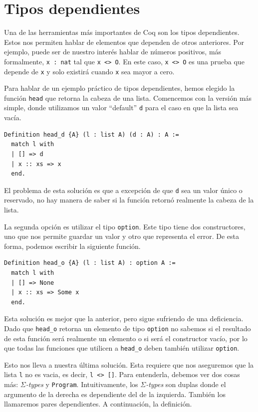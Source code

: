 \section{Tipos dependientes}

Una de las herramientas más importantes de Coq son los tipos dependientes. Estos nos permiten hablar de elementos que dependen de otros anteriores. Por ejemplo, puede ser de nuestro interés hablar de números positivos, más formalmente, \lstinline{x : nat} tal que \lstinline{x <> O}. En este caso, \lstinline{x <> O} es una prueba que depende de \lstinline{x} y solo existirá cuando \lstinline{x} sea mayor a cero.

Para hablar de un ejemplo práctico de tipos dependientes, hemos elegido la función \lstinline{head} que retorna la cabeza de una lista. Comencemos con la versión más simple, donde utilizamos un valor ``default'' \lstinline{d} para el caso en que la lista sea vacía.

\begin{lstlisting}
Definition head_d {A} (l : list A) (d : A) : A :=
  match l with
  | [] => d
  | x :: xs => x
  end.
\end{lstlisting}

El problema de esta solución es que a excepción de que \lstinline{d} sea un valor único o reservado, no hay manera de saber si la función retornó realmente la cabeza de la lista.

La segunda opción es utilizar el tipo \lstinline{option}. Este tipo tiene dos constructores, uno que nos permite guardar un valor y otro que representa el error. De esta forma, podemos escribir la siguiente función.

\begin{lstlisting}
Definition head_o {A} (l : list A) : option A :=
  match l with
  | [] => None
  | x :: xs => Some x
  end.
\end{lstlisting}

Esta solución es mejor que la anterior, pero sigue sufriendo de una deficiencia. Dado que \lstinline{head_o} retorna un elemento de tipo \lstinline{option} no sabemos si el resultado de esta función será realmente un elemento o si será el constructor vacío, por lo que todas las funciones que utilicen a \lstinline{head_o} deben también utilizar \lstinline{option}.

Esto nos lleva a nuestra última solución. Esta requiere que nos aseguremos que la lista \lstinline{l} no es vacia, es decir, \lstinline{l <> []}. Para entenderla, debemos ver dos cosas más: $\Sigma$\textit{-types} y \lstinline{Program}.
Intuitivamente, los $\Sigma$\textit{-types} son duplas donde el argumento de la derecha es dependiente del de la izquierda. También los llamaremos pares dependientes. A continuación, la definición.

